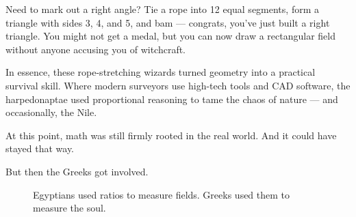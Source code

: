 Need to mark out a right angle? Tie a rope into 12 equal segments, form a triangle with sides 3, 4, and 5, and bam --- congrats, you’ve just built a right triangle. You might not get a medal, but you can now draw a rectangular field without anyone accusing you of witchcraft. 

In essence, these rope-stretching wizards turned geometry into a practical survival skill. Where modern surveyors use high-tech tools and CAD software, the harpedonaptae used proportional reasoning to tame the chaos of nature --- and occasionally, the Nile.



At this point, math was still firmly rooted in the real world. And it could have stayed that way.  

But then the Greeks got involved.  

\begin{figure}[H]
\centering
{}
\caption{Egyptians used ratios to measure fields. Greeks used them to measure the soul.}
\end{figure}


